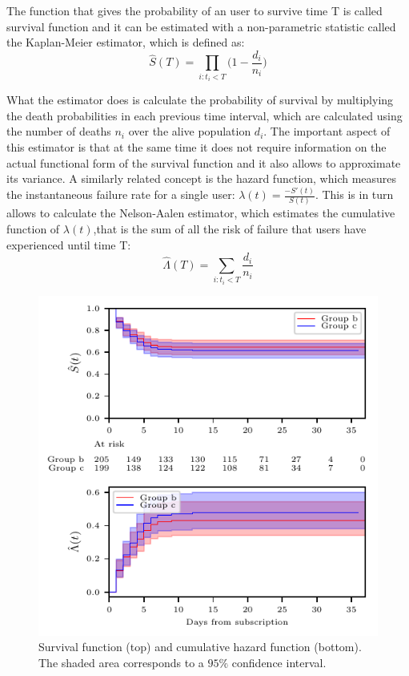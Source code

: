 \documentclass[paper=a4, fontsize=10pt]{report}
\begin{document}
The function that gives the probability of an user to survive time T is called survival function and it can be estimated
with a non-parametric statistic called the Kaplan-Meier estimator, which is defined as:
\begin{equation}
 \hat{S}(T) = \prod_{i: t_{i} < T} \Big(1 - \frac{d_{i}}{n_{i}} \Big)
\end{equation}


What the estimator does is calculate the probability of survival by multiplying the death probabilities in each previous time interval, which
are calculated using the number of deaths $n_{i}$ over the alive population $d_{i}$. The important aspect of this 
estimator is that at the same time it does not require information on the actual functional form of the survival function
and it also allows to approximate its variance. A similarly related concept is the hazard function, which measures
the instantaneous failure rate for a single user: $ \lambda (t) = \frac{-S'(t)}{S(t)}
$. This is in turn allows to calculate the Nelson-Aalen estimator, which estimates the cumulative function of $\lambda(t)$,that
is the sum of all the risk of failure that users have experienced until time T:
\begin{equation}
 \hat{\Lambda}(T) = \sum_{i: t_{i} < T}  \frac{d_{i}}{n_{i}}
\end{equation}



\begin{figure}[h!]
\centering
\captionsetup{justification=centering}
\includegraphics[scale = 0.99]{survival.pdf}
\caption{Survival function (top) and cumulative hazard function (bottom). The shaded area corresponds to a $95\%$ confidence
interval.}
\label{fig:survival}
\end{figure}
\end{document}
